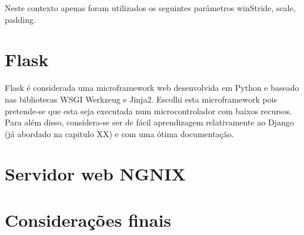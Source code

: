 Neste contexto apenas foram utilizados os seguintes parâmetros winStride, scale, padding. 







\section{Flask}

Flask é considerada uma microframework web desenvolvida em Python e baseado nas bibliotecas WSGI Werkzeug e Jinja2. Escolhi esta microframework pois pretende-se que esta seja executada num microcontrolador com baixos recursos. Para além disso, considera-se ser de fácil aprendizagem relativamente ao Django (já abordado na capitulo XX) e com uma ótima documentação. 




\section{Servidor web NGNIX}

\section{Considerações finais}

